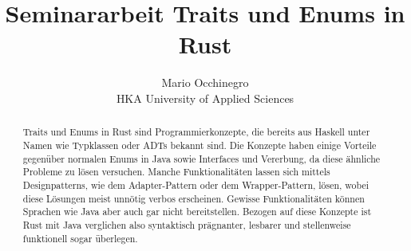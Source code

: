 \documentclass[a4paper, 1ppt]{article}
\title{Seminararbeit Traits und Enums in Rust}
\date{}
\author{Mario Occhinegro\\HKA University of Applied Sciences}
\begin{document}
\maketitle
\newpage
\clearpage
\tableofcontents
\setcounter{page}{1}
\newpage
{}
\maketitle
\begin{abstract}
Traits und Enums in Rust sind Programmierkonzepte, die bereits aus Haskell unter Namen wie Typklassen oder ADTs bekannt sind. Die Konzepte haben einige Vorteile gegenüber normalen Enums in Java sowie Interfaces und Vererbung, da diese ähnliche Probleme zu lösen versuchen.
Manche Funktionalitäten lassen sich mittels Designpatterns, wie dem Adapter-Pattern oder dem Wrapper-Pattern, lösen, wobei diese Lösungen meist unnötig verbos erscheinen. Gewisse Funktionalitäten können Sprachen wie Java aber auch gar nicht bereitstellen.
Bezogen auf diese Konzepte ist Rust mit Java verglichen also syntaktisch prägnanter, lesbarer und stellenweise funktionell sogar überlegen.
\end{abstract}
\end{document}
